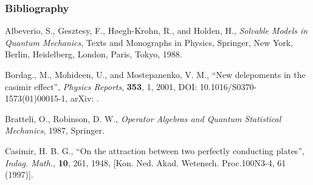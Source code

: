 \documentclass[10pt,t]{beamer}  %
\begin{document}
\begin{frame}
  \frametitle{Bibliography}


  \begin{thebibliography}{99}
   Albeverio, S.,
    Gesztesy, F., H{\o}egh-Krohn, R., and Holden, H., \emph{Solvable
      Models in Quantum Mechanics}, Texts and Monographs in Physics,
    Springer, New York, Berlin, Heidelberg, London, Paris, Tokyo,
    1988.

    Bordag., M., Mohideen, U., and Mostepanenko, V. M., ``New
    delepoments in the casimir effect'', \emph{Physics Reports},
    \textbf{353}, 1, 2001, DOI: 10.1016/S0370-1573(01)00015-1, arXiv:
    .

   Bratteli, O.,
    Robinson, D. W., \emph{Operator Algebras and Quantum Statistical
      Mechanics}, 1987, Springer.


   Casimir, H. B. G., ``On
    the attraction between two perfectly conducting plates'',
    \emph{Indag. Math.}, \textbf{10}, 261, 1948, [Kon. Ned. Akad.
    Wetensch. Proc.100N3-4, 61 (1997)].

  \end{thebibliography}

\end{frame}
\end{document}
